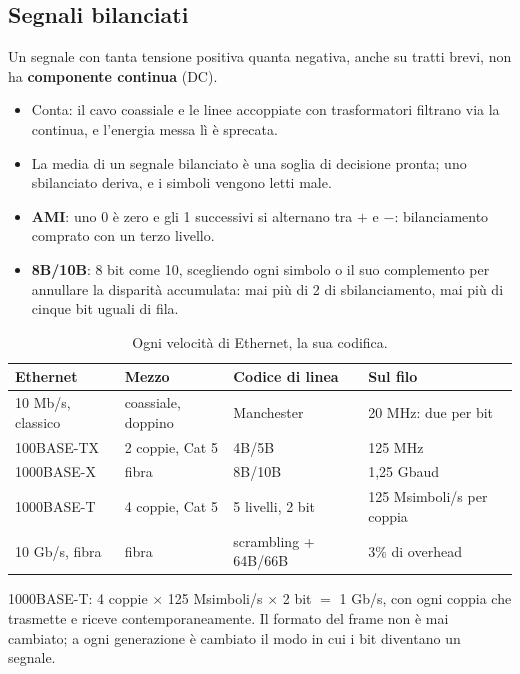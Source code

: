 \subsection{Segnali bilanciati}

Un segnale con tanta tensione positiva quanta negativa, anche su tratti brevi, non ha \textbf{componente continua} (DC).

\begin{itemize}
    \item Conta: il cavo coassiale e le linee accoppiate con trasformatori filtrano via la continua, e l'energia messa lì è sprecata.
    \item La media di un segnale bilanciato è una soglia di decisione pronta; uno sbilanciato deriva, e i simboli vengono letti male.
    \item \textbf{AMI}: uno 0 è zero e gli 1 successivi si alternano tra $+$ e $-$: bilanciamento comprato con un terzo livello.
    \item \textbf{8B/10B}: 8 bit come 10, scegliendo ogni simbolo o il suo complemento per annullare la disparità accumulata: mai più di
          2 di sbilanciamento, mai più di cinque bit uguali di fila.
\end{itemize}

\begin{table}[H]
\centering
\begin{tabular}{llll}
\toprule
\textbf{Ethernet} & \textbf{Mezzo} & \textbf{Codice di linea} & \textbf{Sul filo} \\
\midrule
10 Mb/s, classico & coassiale, doppino & Manchester & 20 MHz: due per bit \\
100BASE-TX & 2 coppie, Cat 5 & 4B/5B & 125 MHz \\
1000BASE-X & fibra & 8B/10B & 1,25 Gbaud \\
1000BASE-T & 4 coppie, Cat 5 & 5 livelli, 2 bit & 125 Msimboli/s per coppia \\
10 Gb/s, fibra & fibra & scrambling + 64B/66B & 3\% di overhead \\
\bottomrule
\end{tabular}
\caption{Ogni velocità di Ethernet, la sua codifica.}
\end{table}

1000BASE-T: 4 coppie $\times$ 125 Msimboli/s $\times$ 2 bit $=$ 1 Gb/s, con ogni coppia che trasmette e riceve contemporaneamente. Il
formato del frame non è mai cambiato; a ogni generazione è cambiato il modo in cui i bit diventano un segnale.

